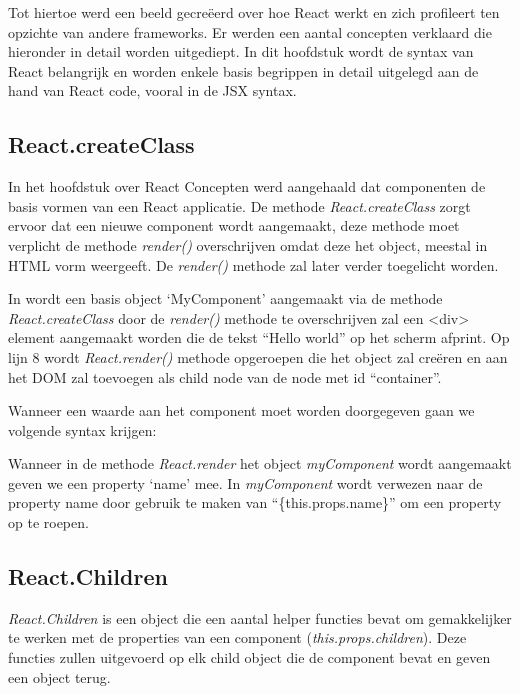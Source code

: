 	Tot hiertoe werd een beeld gecreëerd over hoe React werkt en zich profileert ten opzichte van andere frameworks. Er werden een aantal concepten verklaard die hieronder in detail worden uitgediept. In dit hoofdstuk wordt de syntax van React belangrijk en worden enkele basis begrippen in detail uitgelegd aan de hand van React code, vooral in de JSX syntax.
	
	\subsection{React.createClass}
		
		In het hoofdstuk over React Concepten werd aangehaald dat componenten de basis vormen van een React applicatie. De methode \emph{React.createClass} zorgt ervoor dat een nieuwe component wordt aangemaakt, deze methode moet verplicht de methode \emph{render()} overschrijven omdat deze het object, meestal in HTML vorm weergeeft. De \emph{render()} methode zal later verder toegelicht worden.
		
		
		In  wordt een basis object `MyComponent' aangemaakt via de methode \emph{React.createClass} door de \emph{render()} methode te overschrijven zal een <div> element aangemaakt worden die de tekst ``Hello world'' op het scherm afprint. Op lijn 8 wordt \emph{React.render()} methode opgeroepen die het object zal creëren en aan het DOM zal toevoegen als child node van de node met id ``container''.
		
		Wanneer een waarde aan het component moet worden doorgegeven gaan we volgende syntax krijgen:
		
		
		Wanneer in de methode \emph{React.render} het object \emph{myComponent} wordt aangemaakt geven we een property `name' mee. In \emph{myComponent} wordt verwezen naar de property name door gebruik te maken van ``\{this.props.name\}'' om een property op te roepen.
	
	\subsection{React.Children}
		
		\emph{React.Children} is een object die een aantal helper functies bevat om gemakkelijker te werken met de properties van een component (\emph{this.props.children}). Deze functies zullen uitgevoerd op elk child object die de component bevat en geven een object terug.
		
